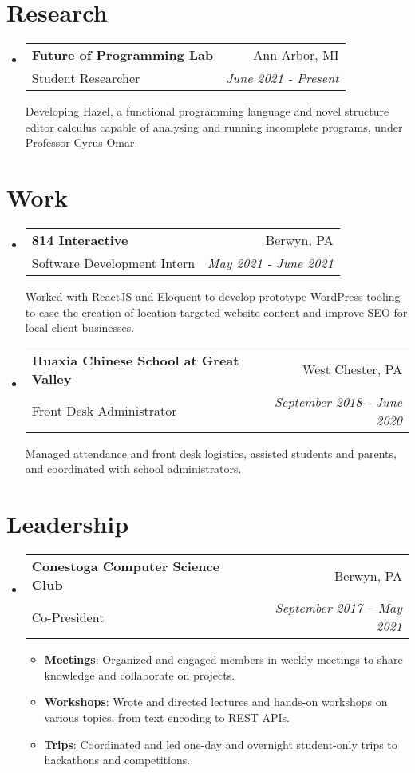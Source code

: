 \documentclass[letterpaper,11pt]{article}
\makeatletter
\newcommand{\resumeSubheading}[4]{
  \vspace{-2pt}\item
    \begin{tabular*}{0.97\textwidth}[t]{l@{\extracolsep{\fill}}r}
      \textbf{#1} & #2 \\
      {#3} & \textit{\small #4} \\[3pt]
    \end{tabular*}\vspace{-5pt}
}
\newcommand{\resumeSubheadingDescription}[1]{
  \parbox{0.97\textwidth}{#1}
}
\newenvironment{resumeSubHeadingList}{
  \begin{itemize}[leftmargin=*, label={}]
}{
  \end{itemize}
}
\newenvironment{resumeItemList}{
  \vspace{-2pt}
  \begin{itemize}
}{
  \end{itemize}
  \vspace{-5pt}
}
\newcommand{\resumeItem}[2]{\item\small{\textbf{#1}{: #2 \vspace{-2pt}}}}
\makeatother
\begin{document}
\section{Research}

  \begin{resumeSubHeadingList}
    \resumeSubheading%
      {Future of Programming Lab}%
      {Ann Arbor, MI}%
      {Student Researcher}%
      {June 2021 - Present}

      \resumeSubheadingDescription{
        Developing Hazel, a functional programming language and novel structure editor calculus
        capable of analysing and running incomplete programs, under Professor Cyrus Omar.
      }
  \end{resumeSubHeadingList}
\section{Work}
  \begin{resumeSubHeadingList}

    \resumeSubheading%
      {814 Interactive}%
      {Berwyn, PA}%
      {Software Development Intern}%
      {May 2021 - June 2021}

      \resumeSubheadingDescription{
        Worked with ReactJS and Eloquent to develop prototype WordPress tooling to ease the creation
        of location-targeted website content and improve SEO for local client businesses.
      }

    \resumeSubheading%
      {Huaxia Chinese School at Great Valley}%
      {West Chester, PA}%
      {Front Desk Administrator}%
      {September 2018 - June 2020}

      \resumeSubheadingDescription{
        Managed attendance and front desk logistics, assisted students and parents, and coordinated
        with school administrators.
      }

  \end{resumeSubHeadingList}
\section{Leadership}
  \begin{resumeSubHeadingList}

    \resumeSubheading%
      {Conestoga Computer Science Club}%
      {Berwyn, PA}%
      {Co-President}%
      {September 2017 -- May 2021}

      \begin{resumeItemList}
        \resumeItem{Meetings}%
          {Organized and engaged members in weekly meetings to share knowledge and collaborate on
            projects.}
        \resumeItem{Workshops}%
          {Wrote and directed lectures and hands-on workshops on various topics, from text encoding
          to REST APIs.}
        \resumeItem{Trips}%
          {Coordinated and led one-day and overnight student-only trips to hackathons and
            competitions.}
      \end{resumeItemList}

  \end{resumeSubHeadingList}
\end{document}

